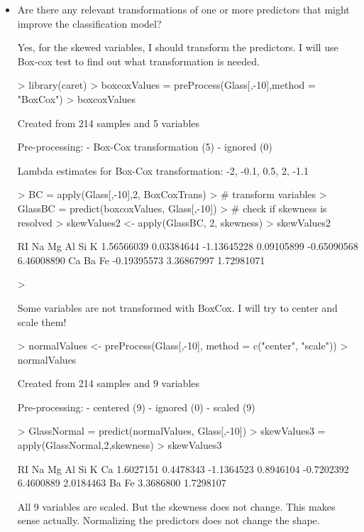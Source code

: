 \documentclass[12pt]{article}
\begin{document}
\begin{itemize}
\item
Are there any relevant transformations of one or more predictors that might improve the classification model?

Yes, for the skewed variables, I should transform the predictors. I will use Box-cox test to find out what transformation is needed.
\begin{Schunk}
\begin{Sinput}
> library(caret)
> boxcoxValues = preProcess(Glass[,-10],method = "BoxCox")
> boxcoxValues
\end{Sinput}
\begin{Soutput}
Created from 214 samples and 5 variables

Pre-processing:
  - Box-Cox transformation (5)
  - ignored (0)

Lambda estimates for Box-Cox transformation:
-2, -0.1, 0.5, 2, -1.1
\end{Soutput}
\begin{Sinput}
> BC = apply(Glass[,-10],2, BoxCoxTrans)
> # transform variables
> GlassBC = predict(boxcoxValues, Glass[,-10])
> # check if skewness is resolved
> skewValues2 <- apply(GlassBC, 2, skewness)
> skewValues2
\end{Sinput}
\begin{Soutput}
         RI          Na          Mg          Al          Si           K 
 1.56566039  0.03384644 -1.13645228  0.09105899 -0.65090568  6.46008890 
         Ca          Ba          Fe 
-0.19395573  3.36867997  1.72981071 
\end{Soutput}
\begin{Sinput}
> 
\end{Sinput}
\end{Schunk}
Some variables are not transformed with BoxCox. I will try to center and scale them!

\begin{Schunk}
\begin{Sinput}
> normalValues <- preProcess(Glass[,-10], method = c("center", "scale"))
> normalValues
\end{Sinput}
\begin{Soutput}
Created from 214 samples and 9 variables

Pre-processing:
  - centered (9)
  - ignored (0)
  - scaled (9)
\end{Soutput}
\begin{Sinput}
> GlassNormal = predict(normalValues, Glass[,-10])
> skewValues3 = apply(GlassNormal,2,skewness)
> skewValues3
\end{Sinput}
\begin{Soutput}
        RI         Na         Mg         Al         Si          K         Ca 
 1.6027151  0.4478343 -1.1364523  0.8946104 -0.7202392  6.4600889  2.0184463 
        Ba         Fe 
 3.3686800  1.7298107 
\end{Soutput}
\end{Schunk}
All 9 variables are scaled. But the skewness does not change. This makes sense actually. Normalizing the predictors does not change the shape.


\end{itemize}
\end{document}
